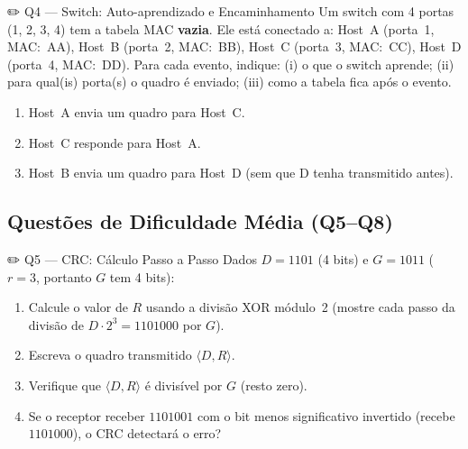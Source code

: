 \documentclass[11pt,a4paper]{article}
\begin{document}
\begin{questao}{✏️ Q4 --- Switch: Auto-aprendizado e Encaminhamento}
Um switch com 4 portas (1, 2, 3, 4) tem a tabela MAC \textbf{vazia}. Ele está conectado a: Host~A (porta~1, MAC:~AA), Host~B (porta~2, MAC:~BB), Host~C (porta~3, MAC:~CC), Host~D (porta~4, MAC:~DD). Para cada evento, indique: (i) o que o switch aprende; (ii) para qual(is) porta(s) o quadro é enviado; (iii) como a tabela fica após o evento.

\begin{enumerate}[label=(\alph*)]
    \item Host~A envia um quadro para Host~C.
    \item Host~C responde para Host~A.
    \item Host~B envia um quadro para Host~D (sem que D tenha transmitido antes).
\end{enumerate}
\end{questao}

\subsection*{Questões de Dificuldade Média (Q5--Q8)}

\begin{questao}{✏️ Q5 --- CRC: Cálculo Passo a Passo}
Dados $D = 1101$ (4 bits) e $G = 1011$ ($r = 3$, portanto $G$ tem 4 bits):
\begin{enumerate}[label=(\alph*)]
    \item Calcule o valor de $R$ usando a divisão XOR módulo~2 (mostre cada passo da divisão de $D \cdot 2^3 = 1101000$ por $G$).
    \item Escreva o quadro transmitido $\langle D, R \rangle$.
    \item Verifique que $\langle D, R \rangle$ é divisível por $G$ (resto zero).
    \item Se o receptor receber $1101001$ com o bit menos significativo invertido (recebe $1101000$), o CRC detectará o erro?
\end{enumerate}
\end{questao}
\end{document}
